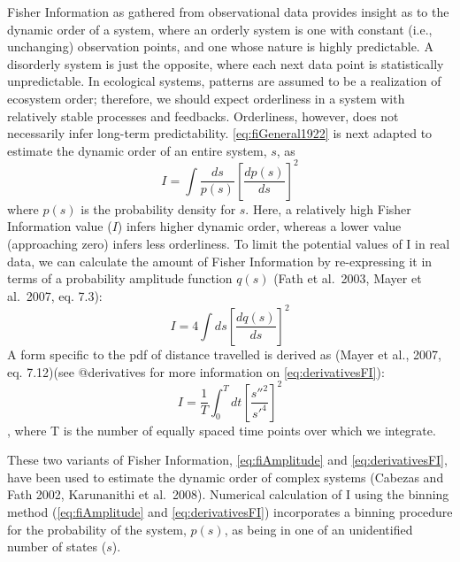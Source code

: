 \documentclass[12pt,twoside]{reedthesis}
\begin{document}
Fisher Information as gathered from observational data provides insight as to the dynamic order of a system, where an orderly system is one with constant (i.e., unchanging) observation points, and one whose nature is highly predictable. A disorderly system is just the opposite, where each next data point is statistically unpredictable. In ecological systems, patterns are assumed to be a realization of ecosystem order; therefore, we should expect orderliness in a system with relatively stable processes and feedbacks. Orderliness, however, does not necessarily infer long-term predictability. \eqref{eq:fiGeneral1922} is next adapted to estimate the dynamic order of an entire system, \(s\), as
\begin{equation} 
I = \int \frac{ds}{p(s)}\left[\frac{dp(s)}{ds}\right]^2
\label{eq:fiAdapted}
\end{equation}
where \(p(s)\) is the probability density for \(s\). Here, a relatively high Fisher Information value (\(I\)) infers higher dynamic order, whereas a lower value (approaching zero) infers less orderliness. To limit the potential values of I in real data, we can calculate the amount of Fisher Information by re-expressing it in terms of a probability amplitude function \(q(s)\) (Fath et al.~2003, Mayer et al.~2007, eq. 7.3):
\begin{equation}
I = 4 \int ds\left[\frac{dq(s)}{ds}\right]^2
\label{eq:fiAmplitude}
\end{equation}
A form specific to the pdf of distance travelled is derived as (Mayer et al., 2007, eq. 7.12)(see @derivatives for more information on \eqref{eq:derivativesFI}):
\begin{equation} 
\label{eq:derivativesFI}
I = \frac{1}{T} \int_0^T dt\left[\frac{s''^2}{s'^4}\right]^2
\end{equation},
where T is the number of equally spaced time points over which we integrate.

These two variants of Fisher Information, \eqref{eq:fiAmplitude} and \eqref{eq:derivativesFI}, have been used to estimate the dynamic order of complex systems (Cabezas and Fath 2002, Karunanithi et al.~2008). Numerical calculation of I using the binning method (\eqref{eq:fiAmplitude} and \eqref{eq:derivativesFI}) incorporates a binning procedure for the probability of the system, \(p(s)\), as being in one of an unidentified number of states (\(s\)).
\end{document}
